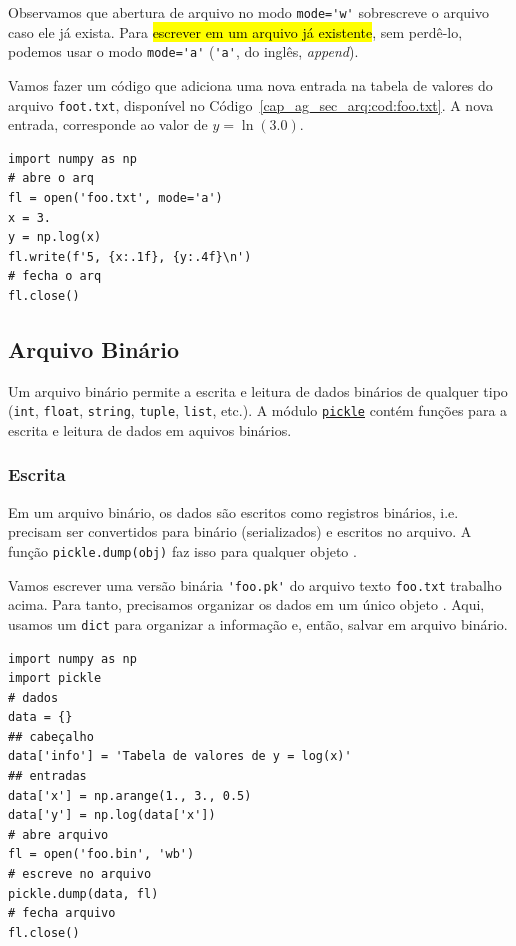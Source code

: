 Observamos que abertura de arquivo no modo \lstinline+mode='w'+ sobrescreve o arquivo caso ele já exista. Para \hl{escrever em um arquivo já existente}, sem perdê-lo, podemos usar o modo \lstinline+mode='a'+ (\lstinline+'a'+, do inglês, \textit{append}).

\begin{ex}
  Vamos fazer um código que adiciona uma nova entrada na tabela de valores do arquivo \lstinline+foot.txt+, disponível no Código~\ref{cap_ag_sec_arq:cod:foo.txt}. A nova entrada, corresponde ao valor de $y = \ln(3.0)$.
\begin{lstlisting}
import numpy as np
# abre o arq
fl = open('foo.txt', mode='a')
x = 3.
y = np.log(x)
fl.write(f'5, {x:.1f}, {y:.4f}\n')
# fecha o arq
fl.close()
\end{lstlisting}
\end{ex}

\subsection{Arquivo Binário}\label{cap_ag_sec_arq:ssec:arqbin}

Um arquivo binário permite a escrita e leitura de dados binários de qualquer tipo (\lstinline+int+, \lstinline+float+, \lstinline+string+, \lstinline+tuple+, \lstinline+list+, etc.). A módulo \href{https://docs.python.org/3/library/pickle.html}{\lstinline+pickle+} contém funções para a escrita e leitura de dados em aquivos binários.

\subsubsection{Escrita}

Em um arquivo binário, os dados são escritos como registros binários, i.e. precisam ser convertidos para binário (serializados) e escritos no arquivo. A função \lstinline+pickle.dump(obj)+ faz isso para qualquer objeto {\python}.

\begin{ex}
  Vamos escrever uma versão binária \lstinline+'foo.pk'+ do arquivo texto \lstinline+foo.txt+ trabalho acima. Para tanto, precisamos organizar os dados em um único objeto {\python}. Aqui, usamos um \lstinline+dict+ para organizar a informação e, então, salvar em arquivo binário.
\begin{lstlisting}[caption=foo.bin, label=cap_ag_sec_arq:cod:foo.bin]
import numpy as np
import pickle
# dados
data = {}
## cabeçalho
data['info'] = 'Tabela de valores de y = log(x)'
## entradas
data['x'] = np.arange(1., 3., 0.5)
data['y'] = np.log(data['x'])
# abre arquivo
fl = open('foo.bin', 'wb')
# escreve no arquivo
pickle.dump(data, fl)
# fecha arquivo
fl.close()
\end{lstlisting}
\end{ex}

